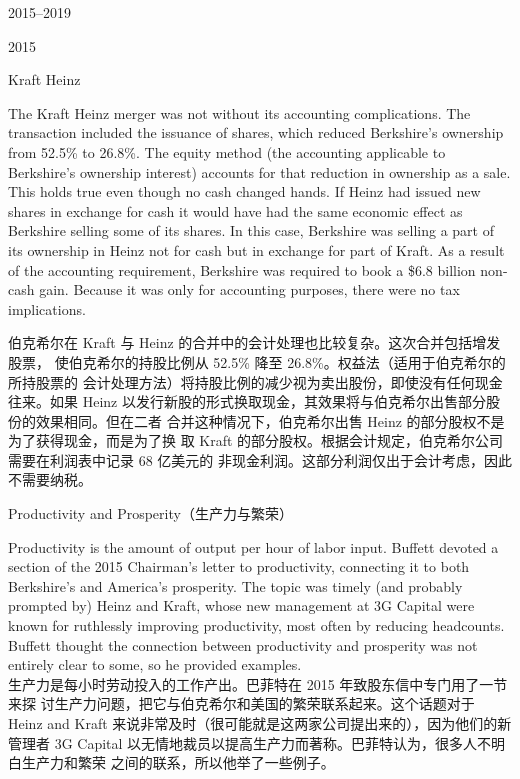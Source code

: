 \begin{chapter}{2015--2019}
\begin{section}{2015}
\begin{subsection}{Kraft Heinz}
\begin{verseparallel}
  {

    The Kraft Heinz merger was not without its accounting complications. The
    transaction included the issuance of shares, which reduced Berkshire’s
    ownership from 52.5\% to 26.8\%. The equity method (the accounting
    applicable to Berkshire’s ownership interest) accounts for that reduction
    in ownership as a sale. This holds true even though no cash changed hands.
    If Heinz had issued new shares in exchange for cash it would have had the
    same economic effect as Berkshire selling some of its shares. In this case,
    Berkshire was selling a part of its ownership in Heinz not for cash but in
    exchange for part of Kraft. As a result of the accounting requirement,
    Berkshire was required to book a \$6.8 billion non-cash gain. Because it was
    only for accounting purposes, there were no tax implications.
  }
  {
    伯克希尔在 Kraft 与 Heinz 的合并中的会计处理也比较复杂。这次合并包括增发股票，
    使伯克希尔的持股比例从 52.5\% 降至 26.8\%。权益法（适用于伯克希尔的所持股票的
    会计处理方法）将持股比例的减少视为卖出股份，即使没有任何现金往来。如果 Heinz
    以发行新股的形式换取现金，其效果将与伯克希尔出售部分股份的效果相同。但在二者
    合并这种情况下，伯克希尔出售 Heinz 的部分股权不是为了获得现金，而是为了换
    取 Kraft 的部分股权。根据会计规定，伯克希尔公司需要在利润表中记录 68 亿美元的
    非现金利润。这部分利润仅出于会计考虑，因此不需要纳税。
  } 

\end{verseparallel}

\end{subsection}

\begin{subsection}{Productivity and Prosperity（生产力与繁荣）}
\begin{verseparallel}
  {
    Productivity is the amount of output per hour of labor input. Buffett
    devoted a section of the 2015 Chairman's letter to productivity, connecting
    it to both Berkshire's and America's prosperity. The topic was timely (and
    probably prompted by) Heinz and Kraft, whose new management at 3G Capital
    were known for ruthlessly improving productivity, most often by reducing
    headcounts. Buffett thought the connection between productivity and
    prosperity was not entirely clear to some, so he provided examples. \\
  }
  {
    生产力是每小时劳动投入的工作产出。巴菲特在 2015 年致股东信中专门用了一节来探
    讨生产力问题，把它与伯克希尔和美国的繁荣联系起来。这个话题对于 Heinz and
    Kraft 来说非常及时（很可能就是这两家公司提出来的），因为他们的新管理者 3G
    Capital 以无情地裁员以提高生产力而著称。巴菲特认为，很多人不明白生产力和繁荣
    之间的联系，所以他举了一些例子。
  }
\end{verseparallel}


\end{subsection}
\end{section}
\end{chapter}
